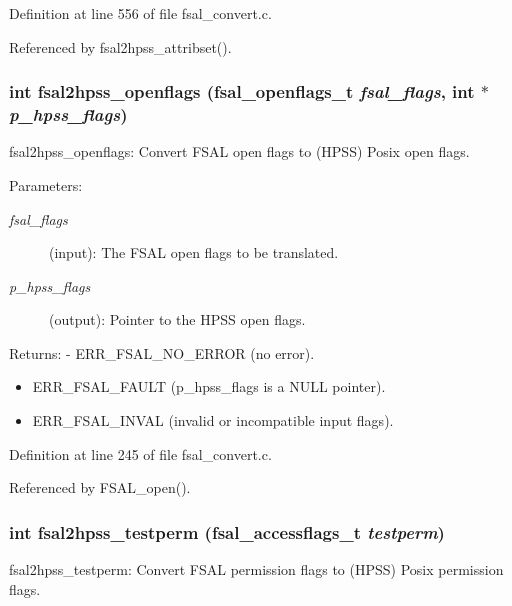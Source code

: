 Definition at line 556 of file fsal\_\-convert.c.

Referenced by fsal2hpss\_\-attribset().
\subsubsection{\setlength{\rightskip}{0pt plus 5cm}int fsal2hpss\_\-openflags (fsal\_\-openflags\_\-t {\em fsal\_\-flags}, int $\ast$ {\em p\_\-hpss\_\-flags})}\label{fsal__convert_8c_a4}


fsal2hpss\_\-openflags: Convert FSAL open flags to (HPSS) Posix open flags.

\begin{Desc}
\item[Parameters:]
\begin{description}
\item[{\em fsal\_\-flags}](input): The FSAL open flags to be translated. \item[{\em p\_\-hpss\_\-flags}](output): Pointer to the HPSS open flags.\end{description}
\end{Desc}
\begin{Desc}
\item[Returns:]- ERR\_\-FSAL\_\-NO\_\-ERROR (no error).\begin{itemize}
\item ERR\_\-FSAL\_\-FAULT (p\_\-hpss\_\-flags is a NULL pointer).\item ERR\_\-FSAL\_\-INVAL (invalid or incompatible input flags). \end{itemize}
\end{Desc}


Definition at line 245 of file fsal\_\-convert.c.

Referenced by FSAL\_\-open().
\subsubsection{\setlength{\rightskip}{0pt plus 5cm}int fsal2hpss\_\-testperm (fsal\_\-accessflags\_\-t {\em testperm})}\label{fsal__convert_8c_a3}


fsal2hpss\_\-testperm: Convert FSAL permission flags to (HPSS) Posix permission flags.

